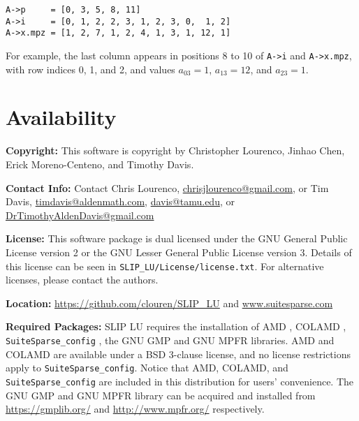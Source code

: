 \documentclass[12pt]{article}
\theoremstyle{definition}
\begin{document}
\begin{verbatim}
A->p     = [0, 3, 5, 8, 11]
A->i     = [0, 1, 2, 2, 3, 1, 2, 3, 0,  1, 2]
A->x.mpz = [1, 2, 7, 1, 2, 4, 1, 3, 1, 12, 1]
\end{verbatim}

For example, the last column appears in positions 8 to 10 of \verb|A->i| and
\verb|A->x.mpz|, with row indices 0, 1, and 2, and values $a_{03}=1$,
$a_{13}=12$, and $a_{23}=1$.

\section{Availability}

\textbf{Copyright:} This software is copyright by Christopher Lourenco, Jinhao
Chen, Erick Moreno-Centeno, and Timothy Davis.

\noindent \textbf{Contact Info:} Contact Chris Lourenco,
\href{mailto:chrisjlourenco@gmail.com}{chrisjlourenco@gmail.com}, or Tim Davis,
\href{mailto:timdavis@aldenmath.com}{timdavis@aldenmath.com},
\href{mailto:davis@tamu.edu}{davis@tamu.edu}, or
\href{DrTimothyAldenDavis@gmail.com}{DrTimothyAldenDavis@gmail.com}

\noindent \textbf{License:} This software package is dual licensed under the
GNU General Public License version 2 or the GNU Lesser General Public License
version 3. Details of this license can be seen in
\verb|SLIP_LU/License/license.txt|.  For alternative licenses, please contact
the authors.

\noindent \textbf{Location:} \url{https://github.com/clouren/SLIP_LU} and
\url{www.suitesparse.com}

\noindent \textbf{Required Packages:} SLIP LU requires the installation of AMD
\cite{amestoy1996approximate,amestoy2004algorithmamd}, COLAMD
\cite{davis2004column,davis2004algorithmcolamd}, \verb|SuiteSparse_config|
\cite{davis2020suitesparse}, the GNU GMP \cite{granlund2015gnu} and GNU MPFR
\cite{fousse2007mpfr} libraries.  AMD and COLAMD are available under a BSD
3-clause license, and no license restrictions apply to
\verb|SuiteSparse_config|.  Notice that AMD, COLAMD, and
\verb|SuiteSparse_config| are included in this distribution for users'
convenience. The GNU GMP and GNU MPFR library can be acquired and installed
from \url{https://gmplib.org/} and \url{http://www.mpfr.org/} respectively.
\end{document}
